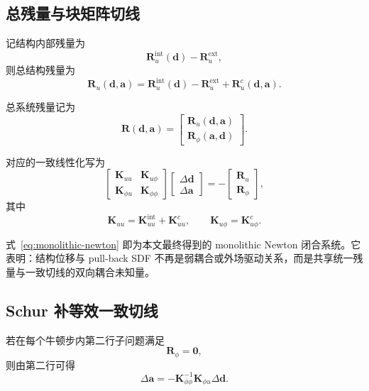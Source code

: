 \documentclass[12pt,a4paper]{ctexart}
\numberwithin{equation}{section}
\newcommand{\bd}{\bm{d}}
\newcommand{\ba}{\bm{a}}
\begin{document}
\subsection{总残量与块矩阵切线}

记结构内部残量为
\begin{equation}
\bm{R}_u^{\mathrm{int}}(\bd)-\bm{R}_u^{\mathrm{ext}},
\end{equation}
则总结构残量为
\begin{equation}
\bm{R}_u(\bd,\ba)
=
\bm{R}_u^{\mathrm{int}}(\bd)-\bm{R}_u^{\mathrm{ext}}+\bm{R}_u^c(\bd,\ba).
\end{equation}

总系统残量记为
\begin{equation}
\boxed{
\bm{R}(\bd,\ba)=
\begin{bmatrix}
\bm{R}_u(\bd,\ba)\\[1mm]
\bm{R}_\phi(\ba,\bd)
\end{bmatrix}.
}
\label{eq:global-residual}
\end{equation}

对应的一致线性化写为
\begin{equation}
\boxed{
\begin{bmatrix}
\bm{K}_{uu} & \bm{K}_{u\phi}\\[1mm]
\bm{K}_{\phi u} & \bm{K}_{\phi\phi}
\end{bmatrix}
\begin{bmatrix}
\Delta\bd\\[1mm]
\Delta\ba
\end{bmatrix}
=
-
\begin{bmatrix}
\bm{R}_u\\[1mm]
\bm{R}_\phi
\end{bmatrix},
}
\label{eq:monolithic-newton}
\end{equation}
其中
\begin{equation}
\bm{K}_{uu} = \bm{K}_{uu}^{\mathrm{int}} + \bm{K}_{uu}^c,
\qquad
\bm{K}_{u\phi}=\bm{K}_{u\phi}^c.
\end{equation}

式~\eqref{eq:monolithic-newton} 即为本文最终得到的 monolithic Newton 闭合系统。它表明：结构位移与 pull-back SDF 不再是弱耦合或外场驱动关系，而是共享统一残量与一致切线的双向耦合未知量。

\subsection{Schur 补等效一致切线}

若在每个牛顿步内第二行子问题满足
\begin{equation}
\bm{R}_\phi=\bm{0},
\end{equation}
则由第二行可得
\begin{equation}
\Delta\ba = -\bm{K}_{\phi\phi}^{-1}\bm{K}_{\phi u}\Delta\bd.
\end{equation}
\end{document}
